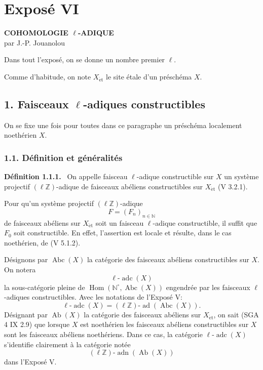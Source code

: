 \documentclass[11pt]{article}
\newenvironment{statement}[1]{\par\medskip\noindent\textbf{#1.}\ }{\par\medskip}
\DeclareMathOperator{\Hom}{Hom}
\providecommand{\Hom}{\operatorname{Hom}}
\providecommand{\adn}{\operatorname{adn}}
\providecommand{\Ab}{\operatorname{Ab}}
\providecommand{\Abc}{\operatorname{Abc}}
\providecommand{\adc}{\operatorname{adc}}
\providecommand{\ad}{\operatorname{ad}}
\providecommand{\adn}{\operatorname{adn}}
\providecommand{\Ab}{\operatorname{Ab}}
\providecommand{\Hom}{\operatorname{Hom}}
\begin{document}
\section*{Exposé VI}

\begin{center}
\textbf{COHOMOLOGIE \(\ell\)-ADIQUE}\\[0.5em]
par J.-P. Jouanolou
\end{center}

Dans tout l'exposé, on se donne un nombre premier \(\ell\).

Comme d'habitude, on note \(X_{\mathrm{\acute et}}\) le site étale d'un préschéma \(X\).

\subsection*{1. Faisceaux \(\ell\)-adiques constructibles}

On se fixe une fois pour toutes dans ce paragraphe un préschéma localement noethérien \(X\).

\subsubsection*{1.1. Définition et généralités}

\begin{statement}{Définition 1.1.1}
On appelle faisceau \(\ell\)-adique constructible sur \(X\) un système projectif \((\ell\mathbb Z)\)-adique de faisceaux abéliens constructibles sur \(X_{\mathrm{\acute et}}\) (V 3.2.1).
\end{statement}

Pour qu'un système projectif \((\ell\mathbb Z)\)-adique
\[
F=(F_n)_{n\in\mathbb N}
\]
de faisceaux abéliens sur \(X_{\mathrm{\acute et}}\) soit un faisceau \(\ell\)-adique constructible, il suffit que \(F_0\) soit constructible. En effet, l'assertion est locale et résulte, dans le cas noethérien, de (V 5.1.2).

Désignons par \(\Abc(X)\) la catégorie des faisceaux abéliens constructibles sur \(X\). On notera
\[
\ell\text{-}\adc(X)
\]
la sous-catégorie pleine de \(\Hom(\mathbb N^{\circ},\Abc(X))\) engendrée par les faisceaux \(\ell\)-adiques constructibles. Avec les notations de l'Exposé V:
\[
\ell\text{-}\adc(X)=(\ell\mathbb Z)\text{-}\ad(\Abc(X)).
\]
Désignant par \(\Ab(X)\) la catégorie des faisceaux abéliens sur \(X_{\mathrm{\acute et}}\), on sait (SGA 4 IX 2.9) que lorsque \(X\) est noethérien les faisceaux abéliens constructibles sur \(X\) sont les faisceaux abéliens noethériens. Dans ce cas, la catégorie \(\ell\text{-}\adc(X)\) s'identifie clairement à la catégorie notée
\[
(\ell\mathbb Z)\text{-}\adn(\Ab(X))
\]
dans l'Exposé V.
\end{document}
